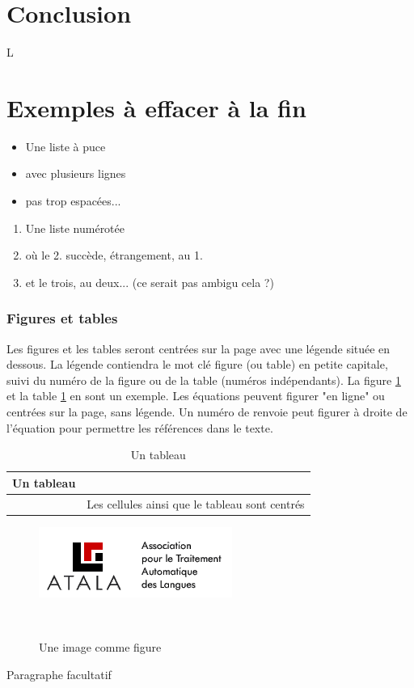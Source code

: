 \documentclass[10pt,a4paper,twoside]{article}
\begin{document}
\section{Conclusion}

L

\section{Exemples à effacer à la fin}

\begin{itemize}
\item Une liste à puce
\item avec plusieurs lignes
\item pas trop espacées... 
\end{itemize}

\begin{enumerate}
\item Une liste numérotée
\item où le 2. succède, étrangement, au 1.
\item et le trois, au deux... (ce serait pas ambigu cela ?)
\end{enumerate}

\subsubsection{Figures et tables}

Les figures et les tables seront centrées sur la page avec une légende située en dessous. La légende contiendra le mot clé figure (ou table) en petite capitale, suivi du numéro de la figure ou de la table (numéros indépendants). La figure \ref{image} et la table \ref{table} en sont un exemple. Les équations peuvent figurer "en ligne" ou centrées sur la page, sans légende. Un numéro de renvoie peut figurer à droite de l'équation pour permettre les références dans le texte.

\begin{table}[!h]
\centering
	\begin{tabular}{|c|p{4cm}|}
	\hline
	Un tableau&\\
	\hline
	&Les cellules ainsi que le tableau sont centrés\\
	\hline
	\end{tabular}
\caption{Un tableau}\label{table}
\end{table}

\begin{figure}[htbp] 
\begin{center} 
\includegraphics{images/atala.png}
\end{center} 
\caption{Une image comme figure} \label{image} \
\end{figure}
Paragraphe facultatif
\end{document}
